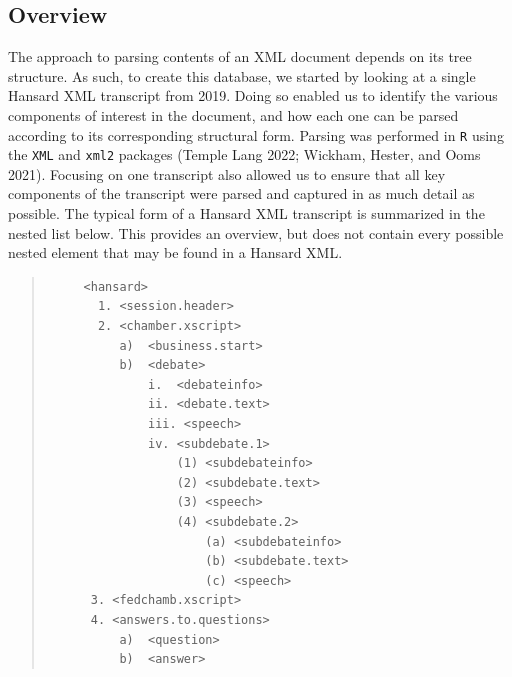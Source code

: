 \documentclass[
  letterpaper,
  DIV=11,
  numbers=noendperiod]{scrartcl}
\begin{document}
\hypertarget{sec-overview}{%
\subsection{Overview}\label{sec-overview}}

The approach to parsing contents of an XML document depends on its tree
structure. As such, to create this database, we started by looking at a
single Hansard XML transcript from 2019. Doing so enabled us to identify
the various components of interest in the document, and how each one can
be parsed according to its corresponding structural form. Parsing was
performed in \texttt{R} using the \texttt{XML} and \texttt{xml2}
packages (Temple Lang 2022; Wickham, Hester, and Ooms 2021). Focusing on
one transcript also allowed us to ensure that all key components of the
transcript were parsed and captured in as much detail as possible. The
typical form of a Hansard XML transcript is summarized in the nested
list below. This provides an overview, but does not contain every
possible nested element that may be found in a Hansard XML.

\begin{quote}
\begin{verbatim}
     <hansard>
       1. <session.header>
       2. <chamber.xscript>
          a)  <business.start>
          b)  <debate>
              i.  <debateinfo>
              ii. <debate.text>
              iii. <speech>
              iv. <subdebate.1>
                  (1) <subdebateinfo>
                  (2) <subdebate.text>
                  (3) <speech>
                  (4) <subdebate.2>
                      (a) <subdebateinfo>
                      (b) <subdebate.text>
                      (c) <speech>
      3. <fedchamb.xscript>
      4. <answers.to.questions>
          a)  <question>
          b)  <answer>
\end{verbatim}
\end{quote}
\end{document}
